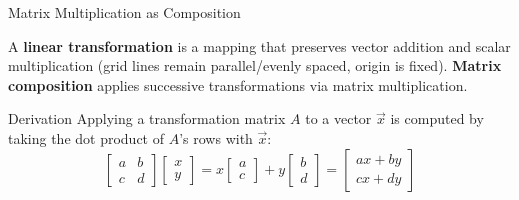 \documentclass[10pt, aspectratio=169]{beamer}
\begin{document}
\begin{frame}{Matrix Multiplication as Composition}
    \begin{definition}
        A \textbf{linear transformation} is a mapping that preserves vector addition and scalar multiplication (grid lines remain parallel/evenly spaced, origin is fixed). \textbf{Matrix composition} applies successive transformations via matrix multiplication.
    \end{definition}

    \begin{block}{Derivation}
        Applying a transformation matrix $A$ to a vector $\vec{x}$ is computed by taking the dot product of $A$'s rows with $\vec{x}$:
        $$\begin{bmatrix} a & b \\ c & d \end{bmatrix} \begin{bmatrix} x \\ y \end{bmatrix} = x\begin{bmatrix} a \\ c \end{bmatrix} + y\begin{bmatrix} b \\ d \end{bmatrix} = \begin{bmatrix} ax+by \\ cx+dy \end{bmatrix}$$
    \end{block}
\end{frame}
\end{document}
